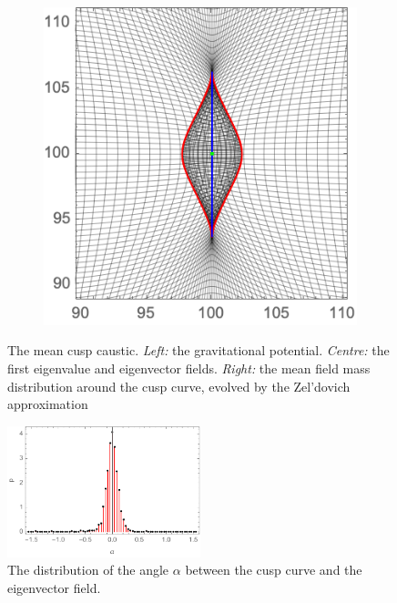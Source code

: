 \documentclass[a4paper, 11pt]{article}
\begin{document}
\begin{figure}
\begin{subfigure}[b]{0.32\textwidth}
\end{subfigure}~
\begin{subfigure}[b]{0.32\textwidth}
\includegraphics[width=\textwidth]{Cusp_mean_Z}
\end{subfigure}
\caption{The mean cusp caustic. \textit{Left:} the gravitational potential. \textit{Centre:} the first eigenvalue and eigenvector fields. \textit{Right:} the mean field mass distribution around the cusp curve, evolved by the Zel'dovich approximation}\label{fig:meanCusp}
\end{figure}

\begin{figure}
\centering
\includegraphics[width=0.5\textwidth]{alpha}
\caption{The distribution of the angle $\alpha$ between the cusp curve and the eigenvector field.} 
\label{fig:alpha}
\end{figure}
\end{document}
